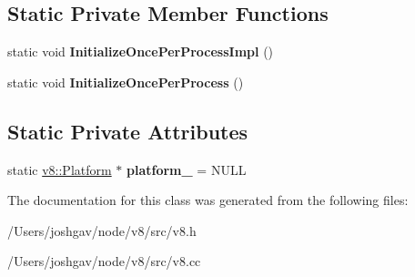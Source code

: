 \subsection*{Static Private Member Functions}
\begin{DoxyCompactItemize}
\item 
static void {\bfseries Initialize\+Once\+Per\+Process\+Impl} ()\hypertarget{classv8_1_1internal_1_1_v8_ad16f7ba2883e639656bb588c31a22b18}{}\label{classv8_1_1internal_1_1_v8_ad16f7ba2883e639656bb588c31a22b18}

\item 
static void {\bfseries Initialize\+Once\+Per\+Process} ()\hypertarget{classv8_1_1internal_1_1_v8_a97c9bb857a84e420fa128e0d80450c70}{}\label{classv8_1_1internal_1_1_v8_a97c9bb857a84e420fa128e0d80450c70}

\end{DoxyCompactItemize}
\subsection*{Static Private Attributes}
\begin{DoxyCompactItemize}
\item 
static \hyperlink{classv8_1_1_platform}{v8\+::\+Platform} $\ast$ {\bfseries platform\+\_\+} = N\+U\+LL\hypertarget{classv8_1_1internal_1_1_v8_a118a0629e468cb5f65237387efc846e0}{}\label{classv8_1_1internal_1_1_v8_a118a0629e468cb5f65237387efc846e0}

\end{DoxyCompactItemize}


The documentation for this class was generated from the following files\+:\begin{DoxyCompactItemize}
\item 
/\+Users/joshgav/node/v8/src/v8.\+h\item 
/\+Users/joshgav/node/v8/src/v8.\+cc\end{DoxyCompactItemize}
